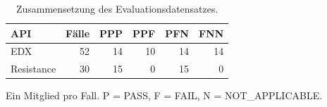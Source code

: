 \begin{table}[htbp]
\centering\small
\caption{Zusammensetzung des Evaluationsdatensatzes.}
\label{tab_v2_dataset}
\begin{tabular}{lrrrrr}
\toprule
API & Fälle & PPP & PPF & PFN & FNN \\
\midrule
EDX & 52 & 14 & 10 & 14 & 14 \\
Resistance & 30 & 15 & 0 & 15 & 0 \\
\bottomrule
\end{tabular}
\par\smallskip\noindent
\begin{minipage}{\linewidth}\footnotesize Ein Mitglied pro Fall. P = PASS, F = FAIL, N = NOT\_APPLICABLE.\end{minipage}
\end{table}
